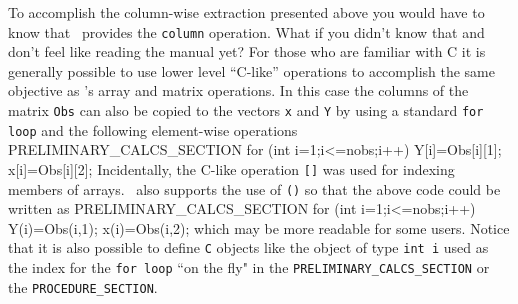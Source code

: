 \documentclass[12pt]{book}
\begin{document}
To accomplish the column-wise extraction presented above 
you would have to know that
\AD\ provides the {\tt column} operation. What if you didn't
know that and don't feel like reading the manual yet?
For those who are familiar with C 
 it is generally possible to use lower level ``C-like'' operations
to accomplish the same objective as \AD's array and matrix operations.
In this case the columns of the matrix {\tt Obs} can also be
copied to the vectors {\tt x} and {\tt Y} by
using a standard {\tt for loop} and the following element-wise operations
\beginexample
PRELIMINARY_CALCS_SECTION
  for (int i=1;i<=nobs;i++)
  {
    Y[i]=Obs[i][1];
    x[i]=Obs[i][2];
  }
\endexample
Incidentally, the C-like operation {\tt []} was used
for indexing members of arrays. \ADM\ also supports 
the use of {\tt ()} so that the above code could be written as
\beginexample
PRELIMINARY_CALCS_SECTION
  for (int i=1;i<=nobs;i++)
  {
    Y(i)=Obs(i,1);
    x(i)=Obs(i,2);
  }
\endexample
\noindent which may be more readable for some users.
Notice that it is also possible to define {\tt C} objects
like the object of type {\tt int i} used as the index for the 
{\tt for loop} ``on the fly" in the
{\tt PRELIMINARY\_CALCS\_SECTION} or the {\tt PROCEDURE\_SECTION}.
\end{document}
